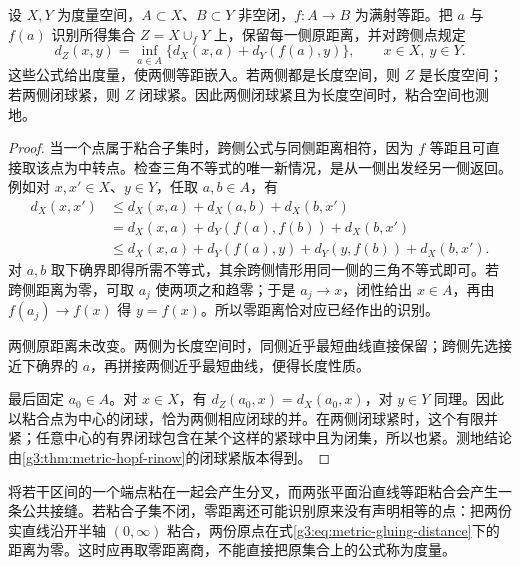 \begin{proposition}\label{g3:prop:metric-gluing-along-closed-set}
	设 \(X,Y\) 为度量空间，\(A\subset X\)、\(B\subset Y\) 非空闭，\(f:A\to B\) 为满射等距。把 \(a\) 与 \(f(a)\) 识别所得集合 \(Z=X\cup_fY\) 上，保留每一侧原距离，并对跨侧点规定
	\begin{equation}\label{g3:eq:metric-gluing-distance}
		d_Z(x,y)=\inf_{a\in A}\{d_X(x,a)+d_Y(f(a),y)\},
		\qquad x\in X,\ y\in Y.
	\end{equation}
	这些公式给出度量，使两侧等距嵌入。若两侧都是长度空间，则 \(Z\) 是长度空间；若两侧闭球紧，则 \(Z\) 闭球紧。因此两侧闭球紧且为长度空间时，粘合空间也测地。
\end{proposition}
\begin{proof}
	当一个点属于粘合子集时，跨侧公式与同侧距离相符，因为 \(f\) 等距且可直接取该点为中转点。检查三角不等式的唯一新情况，是从一侧出发经另一侧返回。例如对 \(x,x'\in X\)、\(y\in Y\)，任取 \(a,b\in A\)，有
	\[
	\begin{aligned}
		d_X(x,x')&\le d_X(x,a)+d_X(a,b)+d_X(b,x')\\
		&=d_X(x,a)+d_Y(f(a),f(b))+d_X(b,x')\\
		&\le d_X(x,a)+d_Y(f(a),y)+d_Y(y,f(b))+d_X(b,x').
	\end{aligned}
	\]
	对 \(a,b\) 取下确界即得所需不等式，其余跨侧情形用同一侧的三角不等式即可。若跨侧距离为零，可取 \(a_j\) 使两项之和趋零；于是 \(a_j\to x\)，闭性给出 \(x\in A\)，再由 \(f(a_j)\to f(x)\) 得 \(y=f(x)\)。所以零距离恰对应已经作出的识别。

	两侧原距离未改变。两侧为长度空间时，同侧近乎最短曲线直接保留；跨侧先选接近下确界的 \(a\)，再拼接两侧近乎最短曲线，便得长度性质。

	最后固定 \(a_0\in A\)。对 \(x\in X\)，有 \(d_Z(a_0,x)=d_X(a_0,x)\)，对 \(y\in Y\) 同理。因此以粘合点为中心的闭球，恰为两侧相应闭球的并。在两侧闭球紧时，这个有限并紧；任意中心的有界闭球包含在某个这样的紧球中且为闭集，所以也紧。测地结论由\cref{g3:thm:metric-hopf-rinow}的闭球紧版本得到。
\end{proof}

将若干区间的一个端点粘在一起会产生分叉，而两张平面沿直线等距粘合会产生一条公共接缝。若粘合子集不闭，零距离还可能识别原来没有声明相等的点：把两份实直线沿开半轴 \((0,\infty)\) 粘合，两份原点在式\eqref{g3:eq:metric-gluing-distance}下的距离为零。这时应再取零距离商，不能直接把原集合上的公式称为度量。
